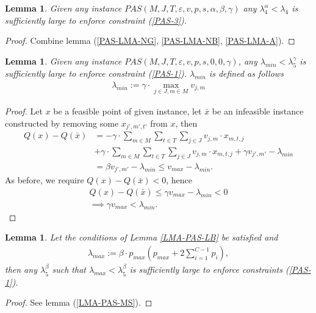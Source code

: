 \documentclass[12pt]{article}
\newtheorem{lemma}[theorem]{Lemma}
\begin{document}
\begin{lemma}
Given any instance $PAS(M, J, T, \varepsilon, v, p, s, \alpha, \beta, \gamma)$ any $\lambda_4^{\alpha} <\lambda_4$ is sufficiently large to enforce constraint (\ref{PAS-3}).
\end{lemma}
\begin{proof}
Combine lemma (\ref{PAS-LMA-NG}, \ref{PAS-LMA-NB}, \ref{PAS-LMA-A}).
\end{proof}

\begin{lemma} \label{PAS-LMA5-G}
Given any instance  $PAS(M, J, T, \varepsilon, v, p, s, 0, 0, \gamma)$, any $\lambda_{min}<\lambda^{\gamma}_5$ is sufficiently large to enforce constraint (\ref{PAS-1}).
$\lambda_{min}$ is defined as follows
\begin{gather}
\lambda_{min} := \gamma \cdot \max_{j \in J, m \in M} v_{j, m}
\end{gather}
\end{lemma}
\begin{proof}
Let $x$ be a feasible point of given instance, let $\bar{x}$ be an infeasible instance constructed by removing some $x_{j', m', t'}$ from $x$, then
\begin{align*}
Q(x) - Q(\bar{x}) &= -\gamma \cdot \sum_{m \in M}  \sum_{t \in T}  \sum_{j \in J} v_{j,m} \cdot x_{m, t, j} \\
&+ \gamma \cdot \sum_{m \in M}  \sum_{t \in T}  \sum_{j \in J} v_{j,m} \cdot x_{m, t, j} + \gamma v_{j', m'} - \lambda_{min}\\
&=  \beta v_{j', m'} - \lambda_{min} \leq v_{max} - \lambda_{min}.
\end{align*}
As before, we require $Q(x) - Q(\bar{x}) < 0$, hence
\begin{gather*}
Q(x) - Q(\bar{x}) \leq \gamma v_{max} - \lambda_{min} < 0 \\
\implies \gamma v_{max} < \lambda_{min}.
\end{gather*}
\end{proof}

\begin{lemma} \label{PAS-LMA5-B}
Let the conditions of Lemma \ref{LMA-PAS-LB} be satisfied and
\begin{gather*}
\lambda_{max} :=  \beta \cdot p_{max}\left(p_{max} + 2\sum_{i=1}^{C-1}p_i \right),
\end{gather*}
then any $\lambda_5^{\beta}$ such that $\lambda_{max} < \lambda_5^{\beta}$ is sufficiently large to enforce constraints (\ref{PAS-1}).
\end{lemma}
\begin{proof}
See lemma (\ref{LMA-PAS-MS}).
\end{proof}
\end{document}
